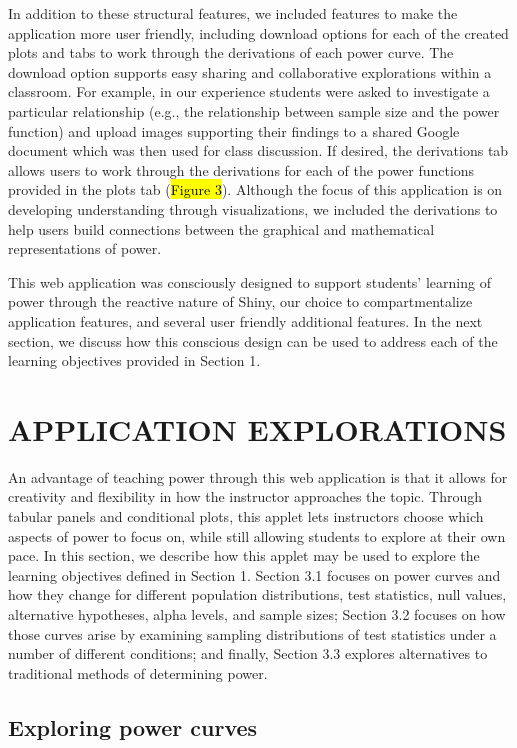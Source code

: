 \documentclass{TISE}
\begin{document}
In addition to these structural features, we included features to make the application more user friendly, including  download options for each of the created plots and tabs to work through the derivations of each power curve. The download option supports easy sharing and collaborative explorations within a classroom. For example, in our experience students were asked to investigate a particular relationship (e.g., the relationship between sample size and the power function) and upload images supporting their findings to a shared Google document which was then used for class discussion. If desired, the derivations tab allows users to work through the derivations for each of the power functions provided in the plots tab (\hl{Figure 3}). Although the focus of this application is on developing understanding through visualizations, we included the derivations to help users build connections between the graphical and mathematical representations of power.

This web application was consciously designed to support students' learning of power through the reactive nature of Shiny, our choice to compartmentalize application features, and several user friendly additional features. In the next section, we discuss how this conscious design can be used to address each of the learning objectives provided in Section 1.

\section{APPLICATION EXPLORATIONS}

An advantage of teaching power through this web application is that it allows for creativity and flexibility in how the instructor approaches the topic. Through tabular panels and conditional plots, this applet lets instructors choose which aspects of power to focus on, while still allowing students to explore at their own pace. In this section, we describe how this applet may be used to explore the learning objectives defined in Section 1. Section 3.1 focuses on power curves and how they change for different population distributions, test statistics, null values, alternative hypotheses, alpha levels, and sample sizes; Section 3.2 focuses on how those curves arise by examining sampling distributions of test statistics under a number of different conditions; and finally, Section 3.3 explores alternatives to traditional methods of determining power.

\subsection{Exploring power curves}
\end{document}
